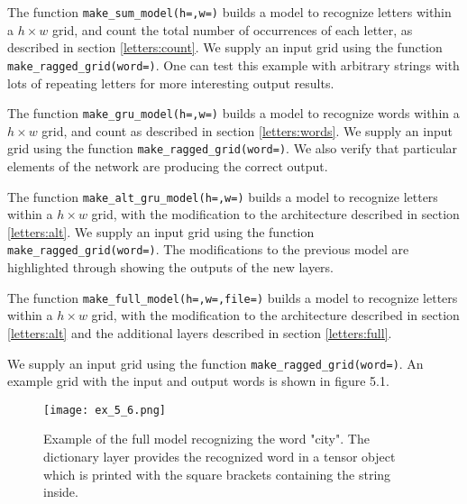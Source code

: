 \documentclass{somasmsc}
\begin{document}
\begin{exa}
The function \verb|make_sum_model(h=,w=)| builds a model to recognize letters within a $h \times w$ grid, and count the total number of occurrences of each letter, as described in section \ref{letters:count}. We supply an input grid using the function \verb|make_ragged_grid(word=)|. One can test this example with arbitrary strings with lots of repeating letters for more interesting output results.
\end{exa}

\begin{exa}
The function \verb|make_gru_model(h=,w=)| builds a model to recognize words within a $h \times w$ grid, and count as described in section \ref{letters:words}. We supply an input grid using the function \verb|make_ragged_grid(word=)|. We also verify that particular elements of the network are producing the correct output.
\end{exa}

\begin{exa}
The function \verb|make_alt_gru_model(h=,w=)| builds a model to recognize letters within a $h \times w$ grid, with the modification to the architecture described in section \ref{letters:alt}. We supply an input grid using the function \verb|make_ragged_grid(word=)|. The modifications to the previous model are highlighted through showing the outputs of the new layers.
\end{exa}

\begin{exa}
The function \verb|make_full_model(h=,w=,file=)| builds a model to recognize letters within a $h \times w$ grid, with the modification to the architecture described in section \ref{letters:alt} and the additional layers described in section \ref{letters:full}. 

We supply an input grid using the function \verb|make_ragged_grid(word=)|. An example grid with the input and output words is shown in figure 5.1.

\begin{figure}[H]\label{letters:ex_5_6}
\begin{center}
\texttt{[image: ex\_5\_6.png]}
\end{center}
\caption{Example of the full model recognizing the word "city". The dictionary layer provides the recognized word in a tensor object which is printed with the square brackets containing the string inside.}
\end{figure}
\end{exa}
\end{document}
